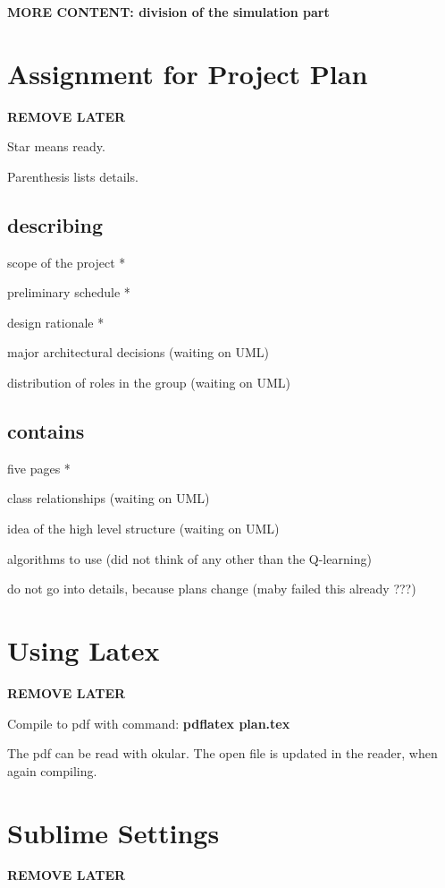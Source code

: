 \documentclass{article}
\begin{document}
\textbf{MORE CONTENT: division of the simulation part}

\newpage



\section{Assignment for Project Plan}
\textbf{REMOVE LATER}

Star means ready.

Parenthesis lists details.

\subsection{describing}

scope of the project *

preliminary schedule *

design rationale * %

major architectural decisions (waiting on UML)

distribution of roles in the group (waiting on UML)


\subsection{contains}

five pages *

class relationships (waiting on UML)

idea of the high level structure (waiting on UML)

algorithms to use (did not think of any other than the Q-learning)

do not go into details, because plans change (maby failed this already ???)



\section{Using Latex}
\textbf{REMOVE LATER}

Compile to pdf with command: \textbf{pdflatex plan.tex}

The pdf can be read with okular.
The open file is updated in the reader, when again compiling.



\section{Sublime Settings}
\textbf{REMOVE LATER}

\end{document}
